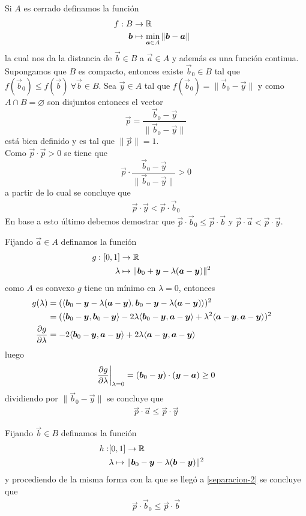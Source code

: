 \begin{demostracion}
Si $A$ es cerrado definamos la funci\'on
\begin{align*}
f:  B &\to \mathbb{R} \cr
	\boldsymbol{b} &\mapsto \min_{\boldsymbol{a}\in A} \|\boldsymbol{b}-\boldsymbol{a}\|
\end{align*}
la cual nos da la distancia de $\vec{b}\in B$ a $\vec{a} \in A$ y adem\'as es una funci\'on continua. Supongamos que $B$ es compacto, entonces existe $\vec{b}_0 \in B$ tal que $f(\vec{b}_0)\leq f(\vec{b}) \:\forall \vec{b}\in B$. Sea $\vec{y}\in A$ tal que $f(\vec{b}_0)=\|\vec{b}_0-\vec{y}\|$ y como $A \cap B = \varnothing$ son disjuntos entonces el vector
$$\vec{p}=\frac{\vec{b}_0-\vec{y}}{\|\vec{b}_0-\vec{y}\|}$$   
est\'a bien definido y es tal que $\|\vec{p}\|=1$.
\\Como $\vec{p}\cdot \vec{p} > 0$ se tiene que
$$\vec{p}\cdot \frac{\vec{b}_0-\vec{y}}{\|\vec{b}_0-\vec{y}\|} > 0$$ 
a partir de lo cual se concluye que
\begin{gather}\label{separacion-1}
\vec{p}\cdot \vec{y} < \vec{p}\cdot \vec{b}_0 \tag{*}
\end{gather}
En base a esto \'ultimo debemos demostrar que $\vec{p}\cdot \vec{b}_0 \leq \vec{p}\cdot \vec{b}$ y $\vec{p}\cdot \vec{a} < \vec{p}\cdot \vec{y}$.

Fijando $\vec{a}\in A$ definamos la funci\'on
\begin{align*}
g:  [0,1]   &\to \mathbb{R} \cr
	\lambda &\mapsto \|\boldsymbol{b}_0+\boldsymbol{y} - \lambda(\boldsymbol{a}-\boldsymbol{y})\|^2
\end{align*}
como $A$ es convexo $g$ tiene un m\'inimo en $\lambda=0$, entonces
\begin{align*}
g(\lambda) 		 &= (\langle \boldsymbol{b}_0-\boldsymbol{y} - \lambda(\boldsymbol{a}-\boldsymbol{y}) , \boldsymbol{b}_0-\boldsymbol{y} - \lambda(\boldsymbol{a}-\boldsymbol{y}) \rangle)^2 \cr
				 &= (\langle \boldsymbol{b}_0-\boldsymbol{y} , \boldsymbol{b}_0-\boldsymbol{y} \rangle - 2\lambda \langle \boldsymbol{b}_0-\boldsymbol{y} , \boldsymbol{a}-\boldsymbol{y}\rangle + \lambda^2 \langle \boldsymbol{a}-\boldsymbol{y} , \boldsymbol{a}-\boldsymbol{y} \rangle)^2 \cr
\frac{\partial g}{\partial \lambda} &= -2\langle \boldsymbol{b}_0-\boldsymbol{y} , \boldsymbol{a}-\boldsymbol{y}\rangle + 2\lambda \langle \boldsymbol{a}-\boldsymbol{y} , \boldsymbol{a}-\boldsymbol{y} \rangle
\end{align*}
luego
$$\left.\frac{\partial g}{\partial \lambda}\right|_{\lambda=0} 
				 = (\boldsymbol{b}_0-\boldsymbol{y})\cdot (\boldsymbol{y}-\boldsymbol{a}) \geq 0$$
dividiendo por $\|\vec{b}_0-\vec{y}\|$ se concluye que
\begin{gather}\label{separacion-2}
\vec{p}\cdot \vec{a} \leq \vec{p}\cdot \vec{y} \tag{**}
\end{gather}

Fijando $\vec{b}\in B$ definamos la funci\'on
\begin{align*}
h:  & [0,1] \to \mathbb{R} \cr
	& \lambda \mapsto \|\boldsymbol{b}_0-\boldsymbol{y} - \lambda(\boldsymbol{b}-\boldsymbol{y})\|^2
\end{align*}
y procediendo de la misma forma con la que se lleg\'o a \eqref{separacion-2} se concluye que
\begin{gather}\label{separacion-3}
\vec{p}\cdot \vec{b}_0 \leq \vec{p}\cdot \vec{b} \tag{***}
\end{gather}


\end{demostracion}
